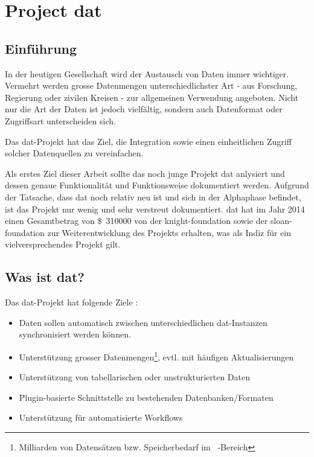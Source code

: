 \chapter{Project dat}\label{sec:dat}

\section{Einführung}

In der heutigen Gesellschaft wird der Austausch von Daten immer wichtiger. Vermehrt werden grosse Datenmengen unterschiedlichster Art - aus Forschung, Regierung oder zivilen Kreisen - zur allgemeinen Verwendung angeboten. Nicht nur die Art der Daten ist jedoch vielfältig, sondern auch Datenformat oder Zugriffsart unterscheiden sich.

Das \gls{dat}-Projekt hat das Ziel, die Integration sowie einen einheitlichen Zugriff solcher Datenquellen zu vereinfachen.

Als erstes Ziel dieser Arbeit sollte das noch junge Projekt \gls{dat} anlysiert und dessen genaue Funktionalität und Funktionsweise dokumentiert werden. Aufgrund der Tatsache, dass \gls{dat} noch relativ neu ist und sich in der Alphaphase befindet, ist das Projekt nur wenig und sehr verstreut dokumentiert. \Gls{dat} hat im Jahr 2014 einen Gesamtbetrag von \SI{310000}[{\$}]{} von der \gls{knight-foundation} sowie der \gls{sloan-foundation} zur Weiterentwicklung des Projekts erhalten, was als Indiz für ein vielversprechendes Projekt gilt.

\section{Was ist dat?} %

Das dat-Projekt hat folgende Ziele \cite{what-is-dat}: 

\begin{itemize}
\item Daten sollen automatisch zwischen unterschiedlichen dat-Instanzen synchronisiert werden können. 
\item Unterstützung grosser Datenmengen\footnote{Milliarden von Datensätzen bzw. Speicherbedarf im \si{\tera\byte}-Bereich}, evtl. mit häufigen Aktualisierungen
\item Unterstützung von tabellarischen oder unstrukturierten Daten
\item Plugin-basierte Schnittstelle zu bestehenden Datenbanken/Formaten
\item Unterstützung für automatisierte Workflows
\end{itemize}

